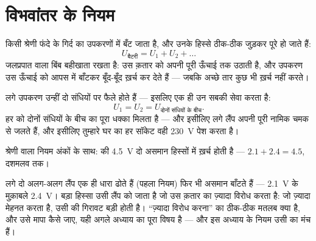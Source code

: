 \section{विभवांतर के नियम}

\begin{proposition}[श्रेणी फंदे के लिए विभवांतर का नियम]\label{prop:g8:circuit-laws:seriesU}
किसी श्रेणी फंदे के गिर्द  का  उपकरणों में बँट जाता है,
और उनके हिस्से ठीक-ठीक जुड़कर पूरे हो जाते हैं:
\[
U_{\text{बैटरी}} = U_1 + U_2 + \dots
\]
जलप्रपात वाला बिंब बहीखाता रखता है:  उस क़तार को अपनी पूरी ऊँचाई
तक उठाती है, और उपकरण उस ऊँचाई को आपस में बाँटकर बूँद-बूँद ख़र्च कर
देते हैं --- जबकि अच्छे तार कुछ भी ख़र्च नहीं करते।
\end{proposition}

\begin{proposition}[समांतर शाखाओं के लिए विभवांतर का नियम]\label{prop:g8:circuit-laws:parallelU}
 लगे उपकरण उन्हीं दो संधियों पर फैले होते हैं --- इसलिए एक
ही  उन सबकी सेवा करता है:
\[
U_1 = U_2 = U_{\text{दोनों संधियों के बीच}} .
\]
हर  को दोनों संधियों के बीच का पूरा धक्का मिलता है --- और इसीलिए
 लगे लैंप अपनी पूरी नामिक चमक से जलते हैं, और इसीलिए
तुम्हारे घर का हर सॉकेट वही \qty{230}{V} पेश करता है।
\end{proposition}

\begin{omfigure}

{\small श्रेणी वाला  नियम अंकों के साथ:  की \qty{4.5}{V}
दो असमान हिस्सों में ख़र्च होती है --- $2.1 + 2.4 = 4.5$, दशमलव तक।}
\end{omfigure}

\begin{example}[हिस्से असमान क्यों?]\label{ex:g8:circuit-laws:unequal}
 लगे दो अलग-अलग लैंप एक ही धारा ढोते हैं (पहला नियम) फिर भी
 असमान बाँटते हैं --- \qty{2.1}{V} के मुक़ाबले \qty{2.4}{V}।
बड़ा हिस्सा उसी लैंप को जाता है जो उस क़तार का ज़्यादा विरोध करता है:
जो ज़्यादा मेहनत करता है, उसी की गिरावट बड़ी होती है। ``ज़्यादा विरोध
करना'' का ठीक-ठीक मतलब क्या है, और उसे मापा कैसे जाए, यही अगले अध्याय
का पूरा विषय है --- और इस अध्याय के नियम उसी का मंच हैं।
\end{example}

